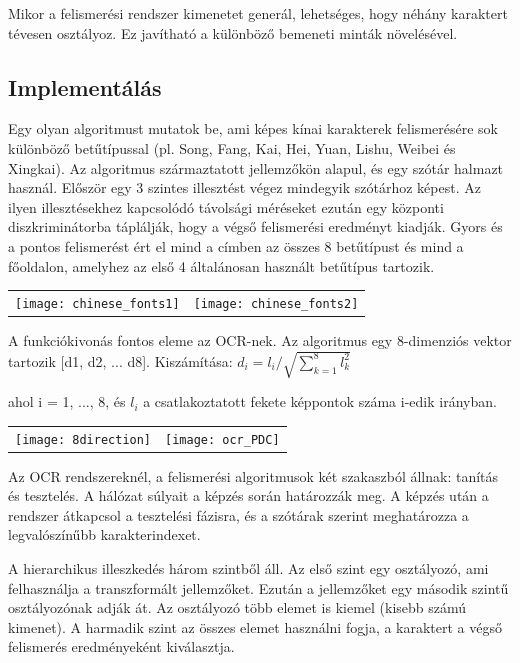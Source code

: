 Mikor a felismerési rendszer kimenetet generál, lehetséges, hogy néhány karaktert tévesen osztályoz. Ez javítható a különböző bemeneti minták növelésével.

\subsection{Implementálás}

Egy olyan algoritmust mutatok be, ami képes kínai karakterek felismerésére sok különböző betűtípussal (pl. Song, Fang, Kai, Hei, Yuan, Lishu, Weibei és Xingkai). Az algoritmus származtatott jellemzőkön alapul, és egy szótár halmazt használ. Először egy 3 szintes illesztést végez mindegyik szótárhoz képest. Az ilyen illesztésekhez kapcsolódó távolsági méréseket ezután egy központi diszkriminátorba táplálják, hogy a végső felismerési eredményt kiadják. Gyors és a pontos felismerést ért el mind a címben az összes 8 betűtípust és mind a főoldalon, amelyhez az első 4 általánosan használt betűtípus tartozik.

\begin{tabular}{ c c }
\texttt{[image: chinese\_fonts1]} & \texttt{[image: chinese\_fonts2]}
\end{tabular}

A funkciókivonás fontos eleme az OCR-nek. Az algoritmus egy 8-dimenziós vektor tartozik [d1, d2, ... d8]. Kiszámítása: \( d_i = l_i / \sqrt{\sum_{k=1}^8 l_k^2} \)

ahol i = 1, ..., 8, és $l_i$ a csatlakoztatott fekete képpontok száma i-edik irányban.

\begin{center}
\begin{tabular}{ c c }
\texttt{[image: 8direction]} & \texttt{[image: ocr\_PDC]}
\end{tabular}
\end{center}

Az OCR rendszereknél, a felismerési algoritmusok két szakaszból állnak: tanítás és tesztelés. A hálózat súlyait a képzés során határozzák meg. A képzés után a rendszer átkapcsol a tesztelési fázisra, és a szótárak szerint meghatározza a legvalószínűbb karakterindexet.

A hierarchikus illeszkedés három szintből áll. Az első szint egy osztályozó, ami felhasználja a transzformált jellemzőket. Ezután a jellemzőket egy második szintű osztályozónak adják át. Az osztályozó több elemet is kiemel (kisebb számú kimenet). A harmadik szint az összes elemet használni fogja, a karaktert a végső felismerés eredményeként kiválasztja.

